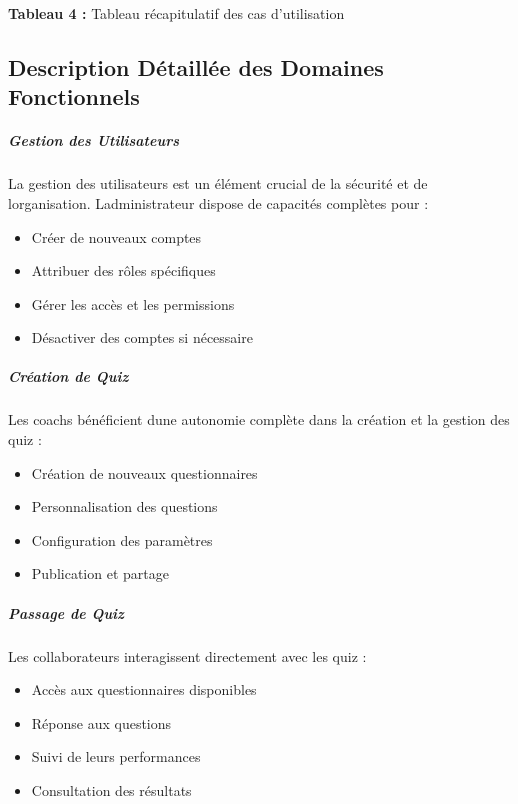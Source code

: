 \documentclass[12pt,a4paper,twoside,openright]{report}
\begin{document}
\begin{center}
\textbf{Tableau 4 :} Tableau récapitulatif des cas d'utilisation
\end{center}

\hypertarget{description-duxe9tailluxe9e-des-domaines-fonctionnels}{%
\subsection{Description Détaillée des Domaines
Fonctionnels}\label{description-duxe9tailluxe9e-des-domaines-fonctionnels}}

\hypertarget{gestion-des-utilisateurs-1}{%
\subparagraph{\texorpdfstring{ Gestion des
Utilisateurs}{ Gestion des Utilisateurs}}\label{gestion-des-utilisateurs-1}}

La gestion des utilisateurs est un élément crucial de la sécurité et de
l\textquotesingle organisation. L\textquotesingle administrateur dispose
de capacités complètes pour :

\begin{itemize}
\item
  Créer de nouveaux comptes
\item
  Attribuer des rôles spécifiques
\item
  Gérer les accès et les permissions
\item
  Désactiver des comptes si nécessaire
\end{itemize}

\hypertarget{cruxe9ation-de-quiz}{%
\subparagraph{\texorpdfstring{ Création de
Quiz}{ Création de Quiz}}\label{cruxe9ation-de-quiz}}

Les coachs bénéficient d\textquotesingle une autonomie complète dans la
création et la gestion des quiz :

\begin{itemize}
\item
  Création de nouveaux questionnaires
\item
  Personnalisation des questions
\item
  Configuration des paramètres
\item
  Publication et partage
\end{itemize}

\hypertarget{passage-de-quiz}{%
\subparagraph{Passage de Quiz}\label{passage-de-quiz}}

Les collaborateurs interagissent directement avec les quiz :

\begin{itemize}
\item
  Accès aux questionnaires disponibles
\item
  Réponse aux questions
\item
  Suivi de leurs performances
\item
  Consultation des résultats
\end{itemize}
\end{document}
